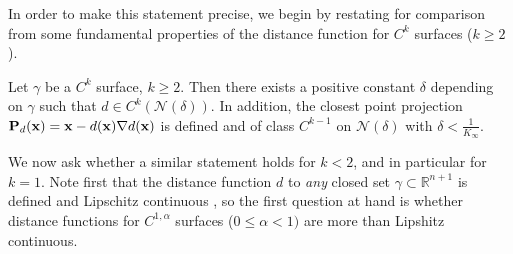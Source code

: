 %
%
%
%

In order to make this statement precise, we begin by restating for comparison from \cite[Lemma 14.16]{GT98} some fundamental properties of the distance function for $C^k$ surfaces ($k \ge 2$).
\begin{lemma} Let $\gamma$ be a $C^k$ surface, $k \ge 2$.  Then there exists a positive constant $\delta$ depending on $\gamma$ such that $d \in C^k(\mathcal{N}(\delta))$.  In addition, the closest point projection ${\bf P}_d({\bf x})={\bf x}-d({\bf x}) \nabla d({\bf x})$ is defined and of class $C^{k-1}$ on $\mathcal{N}(\delta)$ with $\delta < \frac{1}{K_\infty}$. 
\end{lemma}
We now ask whether a similar statement holds for $k<2$, and in particular for $k=1$.  Note first that the distance function $d$ to {\it any} closed set $\gamma \subset \mathbb{R}^{n+1}$ is defined and Lipschitz continuous \cite[Theorem 4.8.1]{Fed59}, so the first question at hand is whether distance functions for $C^{1,\alpha}$ surfaces ($0 \le \alpha <1)$ are more than Lipshitz continuous.  

